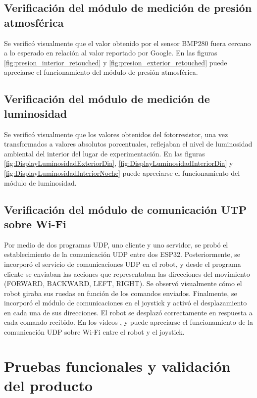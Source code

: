 \subsection{Verificación del módulo de medición de presión atmosférica}
Se verificó visualmente que el valor obtenido por el sensor BMP280 fuera cercano a lo esperado en relación al valor reportado por Google. En las figuras \ref{fig:presion_interior_retouched} y \ref{fig:presion_exterior_retouched} puede apreciarse el funcionamiento del módulo de presión atmosférica.


\subsection{Verificación del módulo de medición de luminosidad}
Se verificó visualmente que los valores obtenidos del fotorresistor, una vez transformados a valores absolutos porcentuales, reflejaban el nivel de luminosidad ambiental del interior del lugar de experimentación.
En las figuras \ref{fig:DisplayLuminosidadExteriorDia}, \ref{fig:DisplayLuminosidadInteriorDia} y \ref{fig:DisplayLuminosidadInteriorNoche} puede apreciarse el funcionamiento del módulo de luminosidad.

\subsection{Verificación del módulo de comunicación UTP sobre Wi-Fi}
Por medio de dos programas UDP, uno cliente y uno servidor, se probó el establecimiento de la comunicación UDP entre dos ESP32. Posteriormente, se incorporó el servicio de comunicaciones UDP en el robot, y desde el programa cliente se enviaban las acciones que representaban las direcciones del movimiento (FORWARD, BACKWARD, LEFT, RIGHT). Se observó visualmente cómo el robot giraba sus ruedas en función de los comandos enviados. Finalmente, se incorporó el módulo de comunicaciones en el joystick y activó el desplazamiento en cada una de sus direcciones. El robot se desplazó correctamente en respuesta a cada comando recibido.
En los videos \cite{Demo_ComWifi}, \cite{Prototipado_Comunicacion_JoystickRobot1} y \cite{Prototipado_Comunicacion_JoystickRobot2} puede apreciarse el funcionamiento de la comunicación UDP sobre Wi-Fi entre el robot y el joystick.

\section{Pruebas funcionales y validación del producto}

